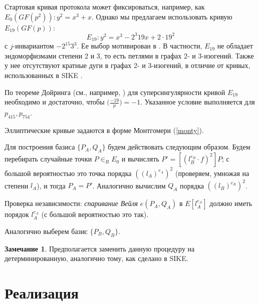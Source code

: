 \documentclass[a4paper,12pt]{article}
\theoremstyle{definition}
\newtheorem{remark}{Замечание}
\begin{document}
% 


Стартовая кривая протокола может фиксироваться, например, как $E_0(GF(p^2)): y^2=x^3+x$. %
Однако мы предлагаем использовать кривую   $E_{19}(GF(p))$:
\begin{equation}
E_{19}\!: y^2 = x^3 - 2^3 19 x + 2 \!\cdot\! 19^2
\end{equation}
с $j$-инвариантом $-2^{15} 3^3$. Ее выбор мотивирован в \cite{StartingCurve}. В частности,  $E_{19}$ не обладает эндоморфизмами степени 2 и 3, то есть петлями в
графах 2- и 3-изогений.  Также у  нее отсутствуют кратные дуги в графах 2- и 3-изогений, в отличие от   кривых, использованных в SIKE \cite{SIKE}.
 
По теореме Дойринга (см., например, \cite[Теорема 2.1]{broker}) для суперсингулярности кривой $E_{19}$ необходимо и достаточно, чтобы $\big(\frac{-19}{p}\big) = -1$. %
Указанное условие выполняется для $p_{415}, p_{754}$.

Эллиптические кривые задаются   в форме Монтгомери (\ref{monty}).

Для построения базиса $\{P_A,Q_A\}$ будем действовать следующим образом.
Будем перебирать случайные точки   $P\in_R E_0$ и вычислять $P'=[(l_B ^{e_B}\cdot f)^2]P$; с большой вероятностью это точка порядка $((l_A)^{e_A})^2$ (проверяем, умножая на степени $l_A$), и тогда
 $P_A=P'$.
 Аналогично вычислим $Q_A$ порядка $((l_B)^{e_B})^2$. 
 
 Проверка независимости: \emph{спаривание Вейля} $e(P_A,Q_A)$ в $E[l_A^{e_A}]$ должно иметь порядок $l_A^{e_A}$ (с большой вероятностью это так).
 
Аналогично выберем базис $\{P_B,Q_B\}$.

\begin{remark}
 Предполагается заменить данную процедуру на детерминированную, аналогично тому, как сделано в SIKE.
\end{remark}





\section{Реализация}
\end{document}
